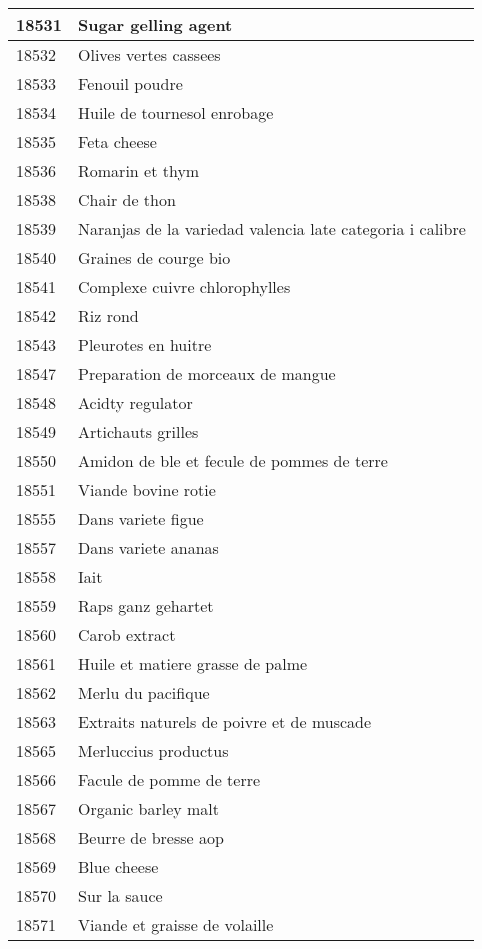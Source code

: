 \begin{longtable}{|l|l|}
18531 & Sugar gelling agent \\ \hline 
18532 & Olives vertes cassees \\ \hline 
18533 & Fenouil poudre \\ \hline 
18534 & Huile de tournesol enrobage \\ \hline 
18535 & Feta cheese \\ \hline 
18536 & Romarin et thym \\ \hline 
18538 & Chair de thon \\ \hline 
18539 & Naranjas de la variedad valencia late categoria i calibre \\ \hline 
18540 & Graines de courge bio \\ \hline 
18541 & Complexe cuivre chlorophylles \\ \hline 
18542 & Riz rond \\ \hline 
18543 & Pleurotes en huitre \\ \hline 
18547 & Preparation de morceaux de mangue \\ \hline 
18548 & Acidty regulator \\ \hline 
18549 & Artichauts grilles \\ \hline 
18550 & Amidon de ble et fecule de pommes de terre \\ \hline 
18551 & Viande bovine rotie \\ \hline 
18555 & Dans variete figue \\ \hline 
18557 & Dans variete ananas \\ \hline 
18558 & Iait \\ \hline 
18559 & Raps ganz gehartet \\ \hline 
18560 & Carob extract \\ \hline 
18561 & Huile et matiere grasse de palme \\ \hline 
18562 & Merlu du pacifique \\ \hline 
18563 & Extraits naturels de poivre et de muscade \\ \hline 
18565 & Merluccius productus \\ \hline 
18566 & Facule de pomme de terre \\ \hline 
18567 & Organic barley malt \\ \hline 
18568 & Beurre de bresse aop \\ \hline 
18569 & Blue cheese \\ \hline 
18570 & Sur la sauce \\ \hline 
18571 & Viande et graisse de volaille \\ \hline 

\end{longtable}
